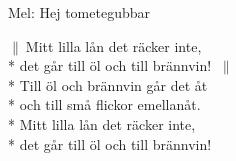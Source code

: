 \begin{SongText}[Studielånet]
    \begin{SongInfo}
        Mel: Hej tometegubbar
    \end{SongInfo}
    \begin{SongVerse}
        $\|\:$Mitt lilla lån det räcker inte,\\*%
        det går till öl och till brännvin! $\:\|$\\*%
        Till öl och brännvin går det åt\\*%
        och till små flickor emellanåt.\\*%
        Mitt lilla lån det räcker inte,\\*%
        det går till öl och till brännvin!
    \end{SongVerse}
\end{SongText}
